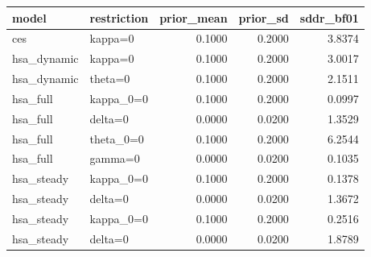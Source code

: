 \begin{tabular}{llrrr}
\toprule
model & restriction & prior\_mean & prior\_sd & sddr\_bf01 \\
\midrule
ces & kappa=0 & 0.1000 & 0.2000 & 3.8374 \\
hsa\_dynamic & kappa=0 & 0.1000 & 0.2000 & 3.0017 \\
hsa\_dynamic & theta=0 & 0.1000 & 0.2000 & 2.1511 \\
hsa\_full & kappa\_0=0 & 0.1000 & 0.2000 & 0.0997 \\
hsa\_full & delta=0 & 0.0000 & 0.0200 & 1.3529 \\
hsa\_full & theta\_0=0 & 0.1000 & 0.2000 & 6.2544 \\
hsa\_full & gamma=0 & 0.0000 & 0.0200 & 0.1035 \\
hsa\_steady & kappa\_0=0 & 0.1000 & 0.2000 & 0.1378 \\
hsa\_steady & delta=0 & 0.0000 & 0.0200 & 1.3672 \\
hsa\_steady & kappa\_0=0 & 0.1000 & 0.2000 & 0.2516 \\
hsa\_steady & delta=0 & 0.0000 & 0.0200 & 1.8789 \\
\bottomrule
\end{tabular}
